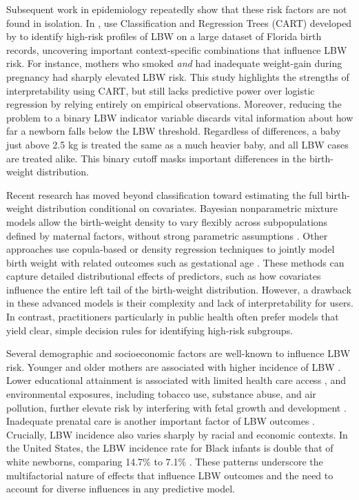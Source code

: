 Subsequent work in epidemiology repeatedly show that these risk factors are not found in isolation. In \citeyear{KITSANTAS2006275}, \textcite{KITSANTAS2006275} use Classification and Regression Trees (CART) developed by \textcite{breiman1984classification} to identify high-risk profiles of LBW on a large dataset of Florida birth records, uncovering important context-specific combinations that influence LBW risk. For instance, mothers who smoked \emph{and} had inadequate weight-gain during pregnancy had sharply elevated LBW risk. This study highlights the strengths of interpretability using CART, but still lacks predictive power over logistic regression by relying entirely on empirical observations. Moreover, reducing the problem to a binary LBW indicator variable discards vital information about how far a newborn falls below the LBW threshold. Regardless of differences, a baby just above 2.5 kg is treated the same as a much heavier baby, and all LBW cases are treated alike. This binary cutoff masks important differences in the birth-weight distribution.

Recent research has moved beyond classification toward estimating the full birth-weight distribution conditional on covariates. Bayesian nonparametric mixture models allow the birth-weight density to vary flexibly across subpopulations defined by maternal factors, without strong parametric assumptions \parencite{dunson2008}. Other approaches use copula-based or density regression techniques to jointly model birth weight with related outcomes such as gestational age \parencite{rathjens2023}. These methods can capture detailed distributional effects of predictors, such as how covariates influence the entire left tail of the birth-weight distribution. However, a drawback in these advanced models is their complexity and lack of interpretability for users. In contrast, practitioners particularly in public health often prefer models that yield clear, simple decision rules for identifying high-risk subgroups. 

Several demographic and socioeconomic factors are well-known to influence LBW risk. Younger and older mothers are associated with higher incidence of LBW \parencite{age_differences_lbw}. Lower educational attainment is associated with limited health care access \parencite{finch2003,jain2024}, and environmental exposures, including tobacco use, substance abuse, and air pollution, further elevate risk by interfering with fetal growth and development \parencite{standford_med_lbw, lu2020combined}. Inadequate prenatal care is another important factor of LBW outcomes \parencite{prenatal_lbw}. Crucially, LBW incidence also varies sharply by racial and economic contexts. In the United States, the LBW incidence rate for Black infants is double that of white newborns, comparing 14.7\% to 7.1\%  \parencite{marchofdimes2024}. These patterns underscore the multifactorial nature of effects that influence LBW outcomes and the need to account for diverse influences in any predictive model. 

